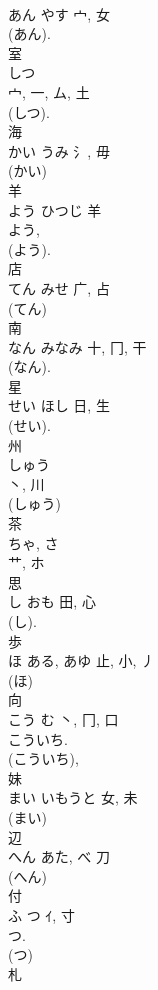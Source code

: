 \documentclass[8pt]{extreport}
\begin{document}
\begin{CJK}{UTF8}{min}
\\	あん	やす	宀, 女	
\\	(あん).	
\\	室	
\\	しつ	
\\	宀, 一, ム, 土	
\\	(しつ). 
\\	海	
\\	かい	うみ	氵, 毋		
\\	(かい) 
\\	羊	
\\	よう	ひつじ	羊	
\\	よう, 
\\	(よう). 
\\	店	
\\	てん	みせ	广, 占	
\\	(てん) 
\\	南	
\\	なん	みなみ	十, 冂, 干		
\\	(なん).	
\\	星	
\\	せい	ほし	日, 生	
\\	(せい). 
\\	州	
\\	しゅう	
\\	丶, 川	
\\	(しゅう) 
\\	茶	
\\	ちゃ, さ	
\\	艹, ホ		
\\	思	
\\	し	おも	田, 心	
\\	(し). 
\\	歩	
\\	ほ	ある, あゆ	止, 小, 丿	
\\	(ほ) 
\\	向	
\\	こう	む	丶, 冂, 口	
\\	こういち.	
\\	(こういち),
\\	妹	
\\	まい	いもうと	女, 未	
\\	(まい) 
\\	辺	
\\	へん	あた, べ	刀		
\\	(へん) 
\\	付	
\\	ふ	つ	ｲ, 寸	
\\	つ. 
\\	(つ) 
\\	札	

\end{CJK}
\end{document}
